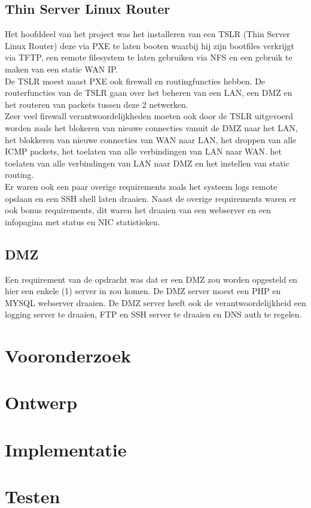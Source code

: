 \documentclass[12pt]{article}
\begin{document}
\subsection{Thin Server Linux Router} %
\label{sub:thin_server_linux_router}
Het hoofddeel van het project was het installeren van een TSLR (Thin Server Linux Router) deze via PXE te laten booten waarbij hij zijn bootfiles verkrijgt via TFTP, een remote filesystem te laten gebruiken via NFS en een gebruik te maken van een static WAN IP.
\\De TSLR moest naast PXE ook firewall en routingfuncties hebben. De routerfuncties van de TSLR gaan over het beheren van een LAN, een DMZ en het routeren van packets tussen deze 2 netwerken.
\\Zeer veel firewall verantwoordelijkheden moeten ook door de TSLR uitgevoerd worden zoals het blokeren van nieuwe connecties vanuit de DMZ naar het LAN, het blokkeren van nieuwe connecties van WAN naar LAN, het droppen van alle ICMP packets, het toelaten van alle verbindingen van LAN naar WAN. het toelaten van alle verbindingen van LAN naar DMZ en het instellen van static routing.
\\Er waren ook een paar overige requirements zoals het systeem logs remote opslaan en een SSH shell laten draaien. Naast de overige requirements waren er ook bonus requirements, dit waren het draaien van een webserver en een infopagina met status en NIC statistieken.
\subsection{DMZ} %
\label{sub:dmz}
Een requirement van de opdracht was dat er een DMZ zou worden opgesteld en hier een enkele (1) server in zou komen. De DMZ server moest een PHP en MYSQL webserver draaien. De DMZ server heeft ook de verantwoordelijkheid een logging server te draaien, FTP en SSH server te draaien en DNS auth te regelen.
\section{Vooronderzoek}
\section{Ontwerp}
\section{Implementatie}
\section{Testen}
\end{document}
